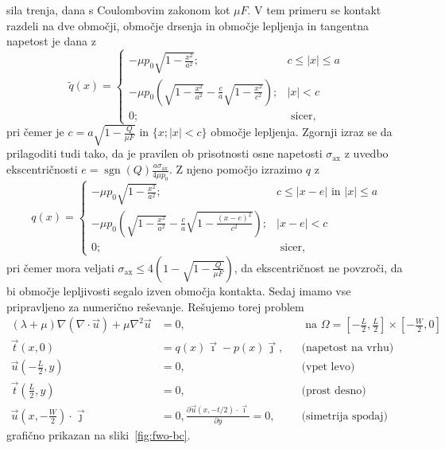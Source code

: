 \documentclass[12pt,a4paper,twoside]{article}
\theoremstyle{definition} %
\theoremstyle{plain} %
\numberwithin{equation}{section}
\newcommand{\dpar}[2]{\ensuremath{\frac{\partial #1}{\partial #2}}}
\newcommand{\vt}{\vec{t}}
\newcommand{\vu}{\vec{u}}
\newcommand{\vi}{\vec{\imath}}
\newcommand{\vj}{\vec{\jmath}}
\newcommand{\sax}{\ensuremath{\sigma_{\text{ax}}}}
\DeclareMathOperator{\sgn}{sgn}
\begin{document}
sila trenja, dana s Coulombovim zakonom kot $\mu F$. V tem primeru se kontakt razdeli na dve
območji, območje drsenja in območje lepljenja in tangentna napetost je dana z
\[
  \tilde q(x) = \begin{cases}
-\mu p_0 \sqrt{1 - \frac{x^2}{a^2}}; & c \leq |x| \leq a \\
-\mu p_0 \left(\sqrt{1 - \frac{x^2}{a^2}} - \frac{c}{a}\sqrt{1 - \frac{x^2}{c^2}}\right);& |x|
< c \\
0; & \text{ sicer,}
\end{cases}
\]
pri čemer je $c = a\sqrt{1 - \frac{Q}{\mu F}}$ in $\{x; |x| < c\}$ območje lepljenja.
Zgornji izraz se da prilagoditi tudi tako, da je pravilen ob prisotnosti osne napetosti
$\sax$ z uvedbo ekscentričnosti $e = \sgn(Q)\frac{a \sax}{4 \mu p_0}$.
Z njeno pomočjo izrazimo $q$ z
\[
q(x) = \begin{cases}
-\mu p_0 \sqrt{1 - \frac{x^2}{a^2}}; & c \leq | x - e | \text{ in } |x| \leq a \\
-\mu p_0 \left(\sqrt{1 - \frac{x^2}{a^2}} - \frac{c}{a}\sqrt{1 - \frac{(x-e)^2}{c^2}}\right); &
|x-e| < c \\
0; & \text{ sicer,}
\end{cases}
\]
pri čemer mora veljati $\sax \leq 4\left( 1 - \sqrt{1-\frac{Q}{\mu F}} \right)$, da ekscentričnost
ne povzroči, da bi območje lepljivosti segalo izven območja kontakta. Sedaj imamo vse pripravljeno
za numerično reševanje. Rešujemo torej problem
\begin{align}
  (\lambda + \mu) \nabla(\nabla\cdot \vu) + \mu \nabla^2 \vu &= 0, && \text{ na } \Omega =
  [-\frac{L}{2}, \frac{L}{2}]\times[-\frac{W}{2}, 0] \nonumber  \\
  \vt(x, 0) &= q(x)\vi - p(x)\vj, && \text{(napetost na vrhu)} \nonumber \\
    \vu(-\frac{L}{2}, y) &= 0,  && \text{(vpet levo)} \label{eq:fwo-problem}\\
    \vt(\frac{L}{2}, y) &= 0, \nonumber  && \text{(prost desno)}\\
    \vu(x, -\frac{W}{2})\cdot \vj &= 0, \dpar{\vu(x, -t/2)\cdot \vi}{y} = 0, \nonumber  && \text{(simetrija
    spodaj)}
\end{align}
grafično prikazan na sliki~\ref{fig:fwo-bc}.
\end{document}
